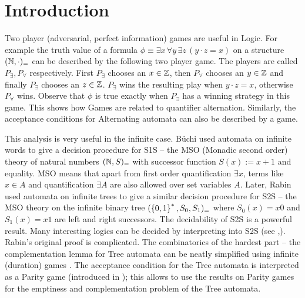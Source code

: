 \chapter{Introduction}

Two player (adversarial, perfect information) games are useful in Logic. For example the truth value of a formula $\phi \equiv \exists x \, \forall y \, \exists z \, (y \cdot z = x)$ on a structure $(\mathbb{N},\cdot)_=$ can be described by the following two player game. The players are called $P_\exists,P_\forall$ respectively. First $P_\exists$ chooses an $x \in \mathbb{Z}$, then $P_\forall$ chooses an $y \in \mathbb{Z}$ and finally $P_\exists$ chooses an $z \in \mathbb{Z}$. $P_\exists$ wins the resulting play when $y \cdot z = x$, otherwise $P_\forall$ wins. Observe that $\phi$ is true exactly when $P_\exists$ has a winning strategy in this game. This shows how Games are related to quantifier alternation. Similarly, the acceptance conditions for Alternating automata can also be described by a game.

This analysis is very useful in the infinite case. B\"uchi \cite{richard_buchi_symposium_1966} used automata on infinite words to give a decision procedure for S1S  -- the MSO (Monadic second order) theory of natural numbers $(\mathbb{N},S)_=$ with successor function $S(x) := x+1$ and equality. MSO means that apart from first order quantification $\exists x$, terms like $x \in A$ and quantification $\exists A$ are also allowed over set variables $A$. Later, Rabin \cite{rabin_decidability_1969} used automata on infinite trees to give a similar decision procedure for S2S -- the MSO theory on the infinite binary tree $(\left\{0,1\right\}^*,S_0,S_1)_=$ where $S_0(x)=x0$ and $S_1(x)=x1$ are left and right successors. The decidability of S2S is a powerful result. Many interesting logics can be decided by interpreting into S2S (see \cite{rabin_decidability_1969},\cite[Chap~7]{classical_prob}). Rabin's original proof is complicated. The combinatorics of the hardest part -- the complementation lemma for Tree automata can be neatly simplified using infinite (duration) games \cite[Chap~8]{thomas2002automata}. The acceptance condition for the Tree automata is interpreted as a Parity game (introduced in ); this allows to use the results on Parity games for the emptiness and complementation problem of the Tree automata.


